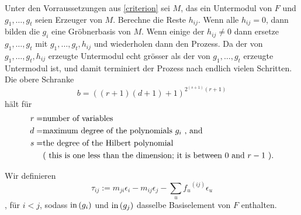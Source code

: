 \documentclass{article}
\begin{document}
	\begin{algo}
		Unter den Vorraussetzungen aus \ref{criterion} 
		sei
		\( M \),
		das ein Untermodul von
		\( F \)
		und 
		\( g_{1},\dots,g_{t}\)
		seien  Erzeuger von 
		\( M \).
		Berechne die Reste
		\( h_{ij} \).
		Wenn alle 
		\( h_{ij} = 0 \),
		dann bilden die 
		\(g_{i} \)
		eine Gr\"obnerbasis von 
		\( M \).
		Wenn einige der 
		\( h_{ij} \neq 0 \)
		dann ersetze 
		\( g_{1},\dots,g_{t}\)
		mit 
		\( g_{1},\dots,g_{t},h_{ij} \)
		und wiederholen dann den Prozess.
		Da der von
		\( g_{1},\dots,g_{t},h_{ij} \)
		erzeugte Untermodul echt gr\"osser als der von
		\( g_{1},\dots,g_{t}\)
		erzeugte Untermodul ist, 
		und damit terminiert der Prozess nach endlich vielen Schritten.
		Die obere Schranke 
		\[
			b=\left( 
				\left( r+1 \right)
				\left( d+1 \right)+1 
			\right)^{2^{(s+1)}(r+1) }
		\]	
		h\"alt f\"ur
		\begin{align*}	
			r = &\text{number of variables} \\
			d = &\text{maximum degree of the polynomials \( g_i\) , and } \\
			s = &\text{the degree of the Hilbert polynomial } \\
			    &\text{( this is one less than the dimension; it is between \( 0 \) and \(r-1\) ).}
		\end{align*}

	\end{algo}
	\begin{defn}
		Wir definieren
		\[
			\tau_{ij}:=
			m_{ji}\epsilon_{i} - 
			m_{ij} \epsilon_{j} - 
			\sum_{u} {f_{u}}^{\left( ij \right) } 
			\epsilon_{u} 
		\],
		f\"ur
		\( i < j \),
		sodass 
		\( \operatorname{in} \left( g_{i}  \right) \)
		und
		\( \operatorname{in} \left( g_{j}  \right) \)
		dasselbe Basiselement von \( F \)
		enthalten.
	\end{defn}
\end{document}
